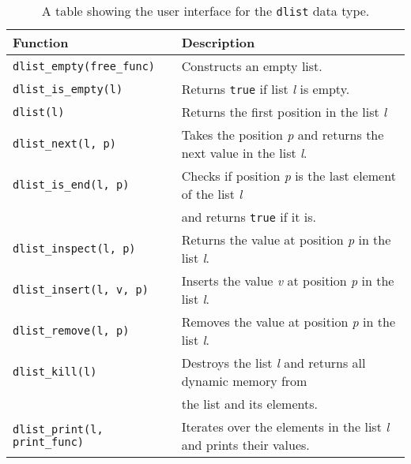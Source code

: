 \documentclass{article}
\begin{document}
\begin{table}[H]
\caption{\label{tab:dlist}
A table showing the user interface for the \texttt{dlist} data type.
}
\centering
\begin{tabular}{l|l}
\textbf{Function} & Description\\
\hline
\texttt{dlist\_empty(free\_func)} & Constructs an empty list. \\
\texttt{dlist\_is\_empty(l)} & Returns \texttt{true} if list \textit{l} is empty. \\
\texttt{dlist(l)} & Returns the first position in the list \textit{l} \\
\texttt{dlist\_next(l, p)} & Takes the position \textit{p} and returns the next value in the list \textit{l}. \\
\texttt{dlist\_is\_end(l, p)} & Checks if position \textit{p} is the last element of the list \textit{l} \\
&     and returns \texttt{true} if it is.  \\
\texttt{dlist\_inspect(l, p)} & Returns the value at position \textit{p} in the list \textit{l}. \\
\texttt{dlist\_insert(l, v, p)} &Inserts the value \textit{v} at position \textit{p} in the list \textit{l}. \\
\texttt{dlist\_remove(l, p)} & Removes the value at position \textit{p} in the list \textit{l}. \\
\texttt{dlist\_kill(l)} & Destroys the list \textit{l} and returns all dynamic memory from \\
&the list and its elements.\\
\texttt{dlist\_print(l, print\_func)} & Iterates over the elements in the list \textit{l} and prints their values. \\
\end{tabular}
\end{table}
\end{document}

